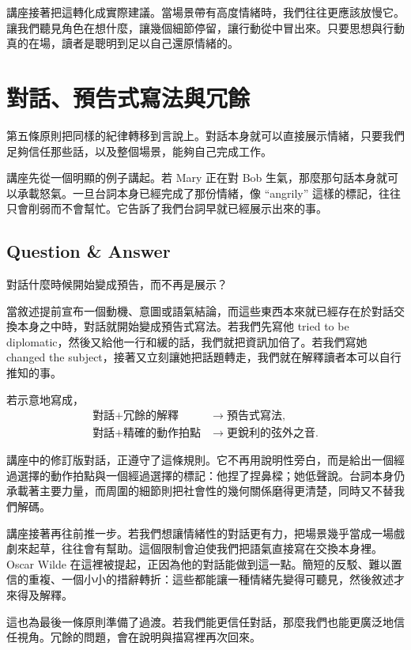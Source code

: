 講座接著把這轉化成實際建議。當場景帶有高度情緒時，我們往往更應該放慢它。讓我們聽見角色在想什麼，讓幾個細節停留，讓行動從中冒出來。只要思想與行動真的在場，讀者是聰明到足以自己還原情緒的。

\section{對話、預告式寫法與冗餘}

第五條原則把同樣的紀律轉移到言說上。對話本身就可以直接展示情緒，只要我們足夠信任那些話，以及整個場景，能夠自己完成工作。

講座先從一個明顯的例子講起。若 Mary 正在對 Bob 生氣，那麼那句話本身就可以承載怒氣。一旦台詞本身已經完成了那份情緒，像 ``angrily'' 這樣的標記，往往只會削弱而不會幫忙。它告訴了我們台詞早就已經展示出來的事。

\subsection{Question \& Answer}

對話什麼時候開始變成預告，而不再是展示？

當敘述提前宣布一個動機、意圖或語氣結論，而這些東西本來就已經存在於對話交換本身之中時，對話就開始變成預告式寫法。若我們先寫他 tried to be diplomatic，然後又給他一行和緩的話，我們就把資訊加倍了。若我們寫她 changed the subject，接著又立刻讓她把話題轉走，我們就在解釋讀者本可以自行推知的事。

若示意地寫成，
\begin{align}
\text{對話} + \text{冗餘的解釋}
&\to \text{預告式寫法},\\
\text{對話} + \text{精確的動作拍點}
&\to \text{更銳利的弦外之音}.
\end{align}

講座中的修訂版對話，正遵守了這條規則。它不再用說明性旁白，而是給出一個經過選擇的動作拍點與一個經過選擇的標記：他捏了捏鼻樑；她低聲說。台詞本身仍承載著主要力量，而周圍的細節則把社會性的幾何關係磨得更清楚，同時又不替我們解碼。

講座接著再往前推一步。若我們想讓情緒性的對話更有力，把場景幾乎當成一場戲劇來起草，往往會有幫助。這個限制會迫使我們把語氣直接寫在交換本身裡。Oscar Wilde 在這裡被提起，正因為他的對話能做到這一點。簡短的反駁、難以置信的重複、一個小小的措辭轉折：這些都能讓一種情緒先變得可聽見，然後敘述才來得及解釋。

這也為最後一條原則準備了過渡。若我們能更信任對話，那麼我們也能更廣泛地信任視角。冗餘的問題，會在說明與描寫裡再次回來。


